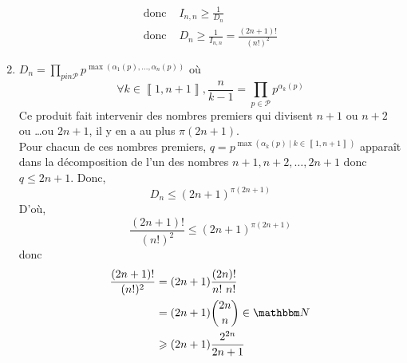 \begin{enumerate}
\begin{align*}
			\text{donc }& I_{n,n} \ge \frac{1}{D_n}\\
			\text{donc }& D_n \ge \frac{1}{I_{n,n}}=\frac{(2n+1)!}{\left( n! \right) ^2}
		\end{align*}
	\item $D_n = \prod_{p in \mathcal{P}} p^{\max(\alpha_1(p),\ldots,\alpha_n(p))}$ où \[
			\forall k \in \left\llbracket 1,n+1 \right\rrbracket, \frac{n}{k-1} = \prod_{p \in \mathcal{P}} p^{\alpha_k(p)}
		\]
	Ce produit fait intervenir des nombres premiers qui divisent $n+1$ ou $n+2$ ou \ldots ou $2n+1$, il y en a au plus $\pi(2n+1)$.\\
	Pour chacun de ces nombres premiers, $q = p^{\max(\alpha_k(p) \mid k \in \left\llbracket 1,n+1 \right\rrbracket)}$ apparaît dans la décomposition de l'un des nombres $n+1,n+2, \ldots, 2n+1$ donc $q \le 2n+1$. Donc, \[
	D_n \le (2n+1)^{\pi(2n+1)}
	\] D'où, \[
	\frac{(2n+1)!}{(n!)^2}\le (2n+1)^{\pi(2n+1)}
	\] donc 
	\begin{align*}
		\frac{(2n+1)!}{(n!)^2} &= (2n+1) \frac{(2n)!}{n!~n!} \\
		&= (2n+1) {2n  \choose n} \in \N \\
		&\ge (2n+1) \frac{2^{2n}}{2n+1}
	\end{align*}
\end{enumerate}
